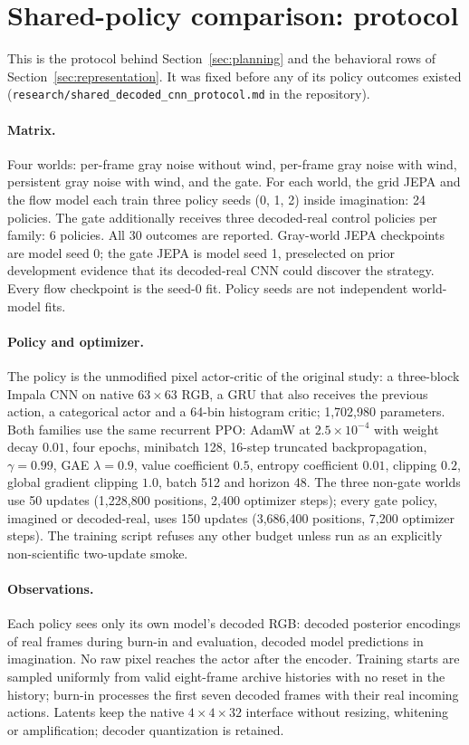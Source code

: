 \section{Shared-policy comparison: protocol}
\label{app:shared-cnn}

This is the protocol behind Section~\ref{sec:planning} and the behavioral rows of
Section~\ref{sec:representation}. It was fixed before any of its policy outcomes existed
(\texttt{research/shared\_decoded\_cnn\_protocol.md} in the repository).

\paragraph{Matrix.}
Four worlds: per-frame gray noise without wind, per-frame gray noise with wind, persistent gray
noise with wind, and the gate. For each world, the grid JEPA and the flow model each train three
policy seeds (0, 1, 2) inside imagination: 24 policies. The gate additionally receives three
decoded-real control policies per family: 6 policies. All 30 outcomes are reported. Gray-world JEPA
checkpoints are model seed 0; the gate JEPA is model seed 1, preselected on prior development
evidence that its decoded-real CNN could discover the strategy. Every flow checkpoint is the seed-0
fit. Policy seeds are not independent world-model fits.

\paragraph{Policy and optimizer.}
The policy is the unmodified pixel actor-critic of the original study: a three-block Impala CNN
on native $63\times63$ RGB, a GRU that also receives the previous action, a categorical actor and
a 64-bin histogram critic; 1,702,980 parameters. Both families use the same recurrent PPO: AdamW at
$2.5\times10^{-4}$ with weight decay $0.01$, four epochs, minibatch 128, 16-step truncated
backpropagation, $\gamma=0.99$, GAE $\lambda=0.9$, value coefficient $0.5$, entropy coefficient
$0.01$, clipping $0.2$, global gradient clipping $1.0$, batch 512 and horizon 48. The three non-gate
worlds use 50 updates (1,228,800 positions, 2,400 optimizer steps); every gate policy, imagined or
decoded-real, uses 150 updates (3,686,400 positions, 7,200 optimizer steps). The training script
refuses any other budget unless run as an explicitly non-scientific two-update smoke.

\paragraph{Observations.}
Each policy sees only its own model's decoded RGB: decoded posterior encodings of real frames
during burn-in and evaluation, decoded model predictions in imagination. No raw pixel reaches the
actor after the encoder. Training starts are sampled uniformly from valid eight-frame archive
histories with no reset in the history; burn-in processes the first seven decoded frames with
their real incoming actions. Latents keep the native $4\times4\times32$ interface without
resizing, whitening or amplification; decoder quantization is retained.

